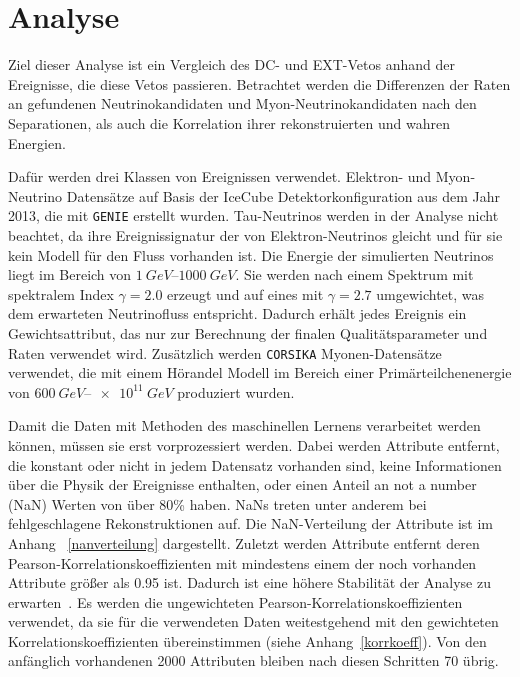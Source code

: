 \chapter{Analyse}
Ziel dieser Analyse ist ein Vergleich des DC- und EXT-Vetos anhand der Ereignisse, die diese Vetos passieren.
Betrachtet werden die Differenzen der Raten an gefundenen Neutrinokandidaten und Myon-Neutrinokandidaten nach den Separationen, als auch die Korrelation ihrer rekonstruierten und wahren Energien.

Dafür werden drei Klassen von Ereignissen verwendet.
Elektron- und Myon-Neutrino Datensätze auf Basis der IceCube Detektorkonfiguration aus dem Jahr 2013, die mit \texttt{GENIE} \cite{GENIE} erstellt wurden.
Tau-Neutrinos werden in der Analyse nicht beachtet, da ihre Ereignissignatur der von Elektron-Neutrinos gleicht und für sie kein Modell für den Fluss vorhanden ist.
Die Energie der simulierten Neutrinos liegt im Bereich von $\SIrange{1}{1000}{GeV}$.
Sie werden nach einem Spektrum mit spektralem Index $γ=2.0$ erzeugt und auf eines mit $γ=2.7$ umgewichtet, was dem erwarteten Neutrinofluss entspricht.
Dadurch erhält jedes Ereignis ein Gewichtsattribut, das nur zur Berechnung der finalen Qualitätsparameter und Raten verwendet wird.
Zusätzlich werden \texttt{CORSIKA} \cite{corsika} Myonen-Datensätze verwendet, die mit einem Hörandel Modell \cite{horandel2004models} im Bereich einer Primärteilchenenergie von $\SIrange{600}{e11}{GeV}$ produziert wurden.

Damit die Daten mit Methoden des maschinellen Lernens verarbeitet werden können, müssen sie erst vorprozessiert werden.
Dabei werden Attribute entfernt, die konstant oder nicht in jedem Datensatz vorhanden sind, keine Informationen über die Physik der Ereignisse enthalten, oder einen Anteil an not a number (NaN) Werten von über 80\% haben. 
NaNs treten unter anderem bei fehlgeschlagene Rekonstruktionen auf. 
Die NaN-Verteilung der Attribute ist im Anhang ~\ref{nanverteilung} dargestellt.
Zuletzt werden Attribute entfernt deren Pearson-Korrelationskoeffizienten mit mindestens einem der noch vorhanden Attribute größer als 0.95 ist.
Dadurch ist eine höhere Stabilität der Analyse zu erwarten~\cite{DataminingOnIce}. 
Es werden die ungewichteten Pearson-Korrelationskoeffizienten verwendet, da sie für die verwendeten Daten weitestgehend mit den gewichteten Korrelationskoeffizienten übereinstimmen (siehe Anhang~\ref{korrkoeff}).
Von den anfänglich vorhandenen 2000 Attributen bleiben nach diesen Schritten 70 übrig.

